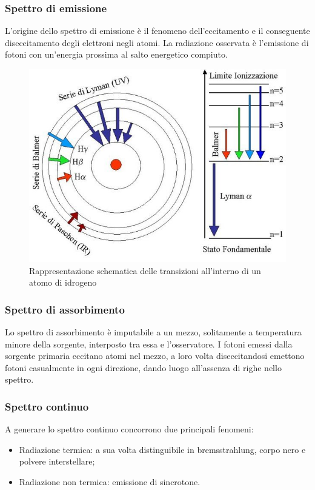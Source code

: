 \subsubsection*{Spettro di emissione}
L'origine dello spettro di emissione è il fenomeno dell'eccitamento e il conseguente diseccitamento degli elettroni negli atomi. La radiazione osservata è l'emissione di fotoni con un'energia prossima al salto energetico compiuto.

\begin{figure}[h]
\includegraphics[scale=0.30]{transizione.pdf}
\centering
\caption{Rappresentazione schematica delle transizioni all'interno di un atomo di idrogeno}
\end{figure}


\subsubsection*{Spettro di assorbimento}
Lo spettro di assorbimento è imputabile a un mezzo, solitamente a temperatura minore della sorgente, interposto tra essa e l'osservatore. I fotoni emessi dalla sorgente primaria eccitano atomi nel mezzo, a loro volta diseccitandosi emettono fotoni casualmente in ogni direzione, dando luogo all'assenza di righe nello spettro.


\subsubsection*{Spettro continuo}
A generare lo spettro continuo concorrono due principali fenomeni: 
\begin{itemize}
\item Radiazione termica: a sua volta distinguibile in bremsstrahlung, corpo nero e polvere interstellare;
\item Radiazione non termica: emissione di sincrotone. 
\end{itemize}

